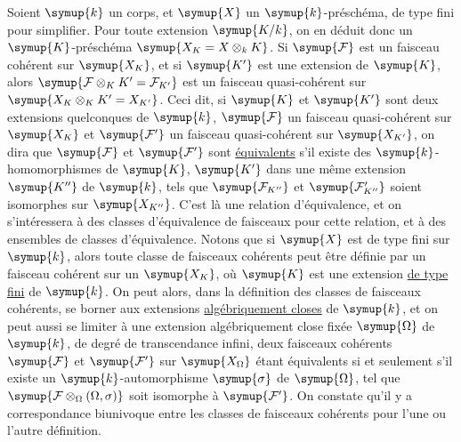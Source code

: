 Soient $\symup{k}$ un corps, et $\symup{X}$ un $\symup{k}$-préschéma, de type fini pour simplifier.
Pour toute extension $\symup{K/k}$, on en déduit donc un $\symup{K}$-préschéma
$\symup{X_K=X\otimes_k K}$. Si $\symup{\mathcal F}$ est un faisceau cohérent sur $\symup{X_K}$, et si
$\symup{K'}$ est une extension de $\symup{K}$, alors
$\symup{\mathcal F\otimes_K K'={\mathcal F}_{K'}}$ est un faisceau quasi-cohérent sur
$\symup{X_K\otimes_K K'=X_{K'}}$. Ceci dit, si $\symup{K}$ et $\symup{K'}$ sont deux extensions
quelconques de $\symup{k}$, $\symup{\mathcal F}$ un faisceau quasi-cohérent sur $\symup{X_K}$ et
$\symup{\mathcal F'}$
un faisceau quasi-cohérent sur $\symup{X_{K'}}$, on dira que $\symup{\mathcal F}$ et
$\symup{\mathcal F'}$ sont \uline{équivalents} s'il existe des $\symup{k}$-homomorphismes de
$\symup{K}$, $\symup{K'}$ dans une même extension $\symup{K''}$ de $\symup{k}$, tels que
$\symup{\mathcal F_{K''}}$ et $\symup{\mathcal F'_{K''}}$ soient isomorphes sur $\symup{X_{K''}}$.
C'est là une relation d'équivalence, et on s'intéressera à des classes
d'équivalence de faisceaux pour cette relation, et à des ensembles de classes
d'équivalence. Notons que si $\symup{X}$ est de type fini sur
$\symup{k}$, alors toute classe de faisceaux cohérents peut être définie par un
faisceau cohérent sur un $\symup{X_K}$, où $\symup{K}$ est une extension \uline{de type fini} de $\symup{k}$.
On peut alors, dans la définition des classes de faisceaux cohérents, se borner
aux extensions \uline{algébriquement closes} de $\symup{k}$, et on peut aussi se limiter à une
extension algébriquement close fixée $\symup{\Omega}$ de $\symup{k}$, de degré de
transcendance infini, deux faisceaux cohérents $\symup{\mathcal F}$ et $\symup{\mathcal F'}$
sur $\symup{X_\Omega}$ étant équivalents si et seulement s'il existe un
$\symup{k}$-automorphisme $\symup{\sigma}$ de $\symup{\Omega}$, tel que
$\symup{\mathcal F\otimes_\Omega(\Omega,\sigma)}$ soit isomorphe à $\symup{\mathcal F'}$.
On constate qu'il y a correspondance biunivoque entre les classes de faisceaux
cohérents pour l'une ou l'autre définition.


